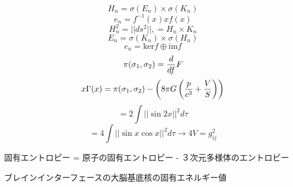 \documentclass{jsarticle}
\begin{document}
\title{}
\author{}
\date{}
\maketitle


  $$ H_n = \sigma(E_n) \times \sigma(K_n) $$
  $$  e_n = f^{-1}(x)xf(x) $$
  $$  H^2_n = ||ds^2||, = H_n \times K_n $$ 
  $$ E_n = \sigma(K_n) \times \sigma(H_n) $$
  $$ e_n = \mathrm{ker} f \oplus \mathrm{im} f $$
  $$ \pi(\sigma_1, \sigma_2) = {d \over df}F $$
  $$ x \Gamma(x) = \pi(\sigma_1, \sigma_2) - \left( 8 \pi G\left({p \over 
  c^3} + {V \over S} \right)\right) $$
  $$ = 2 \int ||\sin 2x||^2 d \tau $$
  $$ = 4 \int ||\sin x \cos x||^2d \tau \to 4 V = g_{ij}^2 $$
  
  固有エントロピー = 原子の固有エントロピー - ３次元多様体のエントロピー

  ブレインインターフェースの大脳基底核の固有エネルギー値
\end{document}
